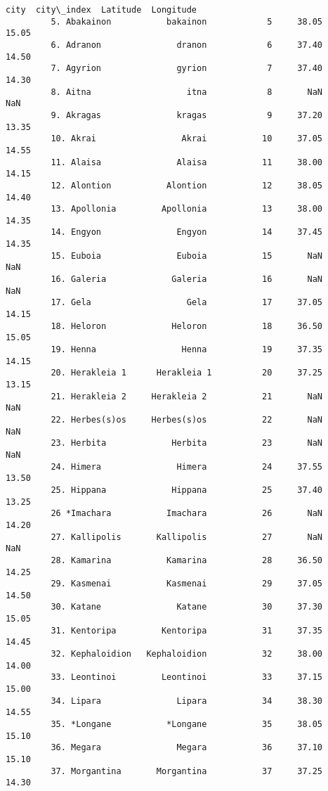 \documentclass[11pt]{article}
\begin{document}
\begin{Verbatim}[commandchars=\\\{\}]
                                     city  city\_index  Latitude  Longitude  
         5. Abakainon           bakainon            5     38.05      15.05  
         6. Adranon               dranon            6     37.40      14.50  
         7. Agyrion               gyrion            7     37.40      14.30  
         8. Aitna                   itna            8       NaN        NaN  
         9. Akragas               kragas            9     37.20      13.35  
         10. Akrai                 Akrai           10     37.05      14.55  
         11. Alaisa               Alaisa           11     38.00      14.15  
         12. Alontion           Alontion           12     38.05      14.40  
         13. Apollonia         Apollonia           13     38.00      14.35  
         14. Engyon               Engyon           14     37.45      14.35  
         15. Euboia               Euboia           15       NaN        NaN  
         16. Galeria             Galeria           16       NaN        NaN  
         17. Gela                   Gela           17     37.05      14.15  
         18. Heloron             Heloron           18     36.50      15.05  
         19. Henna                 Henna           19     37.35      14.15  
         20. Herakleia 1      Herakleia 1          20     37.25      13.15  
         21. Herakleia 2     Herakleia 2           21       NaN        NaN  
         22. Herbes(s)os     Herbes(s)os           22       NaN        NaN  
         23. Herbita             Herbita           23       NaN        NaN  
         24. Himera               Himera           24     37.55      13.50  
         25. Hippana             Hippana           25     37.40      13.25  
         26 *Imachara           Imachara           26       NaN      14.20  
         27. Kallipolis       Kallipolis           27       NaN        NaN  
         28. Kamarina           Kamarina           28     36.50      14.25  
         29. Kasmenai           Kasmenai           29     37.05      14.50  
         30. Katane               Katane           30     37.30      15.05  
         31. Kentoripa         Kentoripa           31     37.35      14.45  
         32. Kephaloidion   Kephaloidion           32     38.00      14.00  
         33. Leontinoi         Leontinoi           33     37.15      15.00  
         34. Lipara               Lipara           34     38.30      14.55  
         35. *Longane           *Longane           35     38.05      15.10  
         36. Megara               Megara           36     37.10      15.10  
         37. Morgantina       Morgantina           37     37.25      14.30  

\end{Verbatim}
\end{document}

